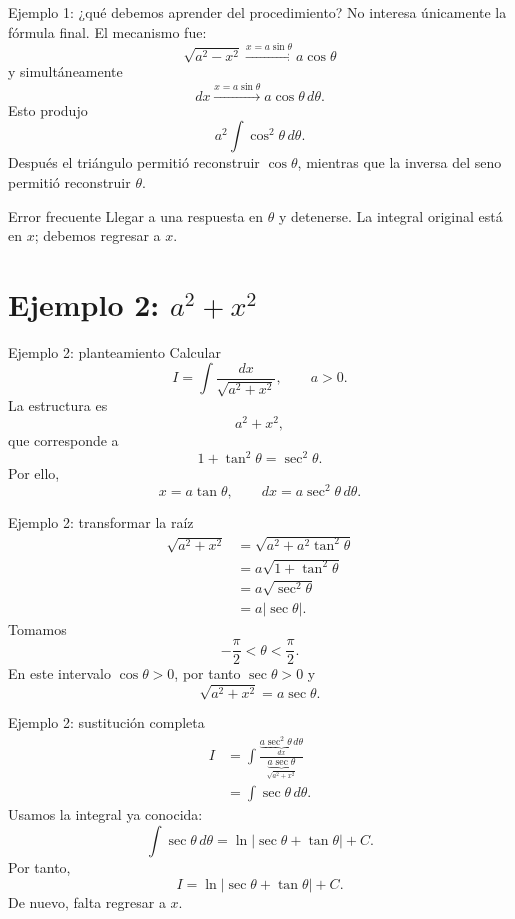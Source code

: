 \documentclass[10pt,aspectratio=169]{beamer}
\begin{document}
\begin{frame}{Ejemplo 1: ¿qué debemos aprender del procedimiento?}
No interesa únicamente la fórmula final. El mecanismo fue:
\[
\sqrt{a^2-x^2}
\xrightarrow{x=a\sin\theta}
a\cos\theta
\]
y simultáneamente
\[
dx\xrightarrow{x=a\sin\theta}a\cos\theta\,d\theta.
\]
Esto produjo
\[
a^2\int\cos^2\theta\,d\theta.
\]
Después el triángulo permitió reconstruir $\cos\theta$, mientras que la inversa del seno permitió reconstruir $\theta$.
\begin{alertblock}{Error frecuente}
Llegar a una respuesta en $\theta$ y detenerse. La integral original está en $x$; debemos regresar a $x$.
\end{alertblock}
\end{frame}

\section{Ejemplo 2: $a^2+x^2$}
\begin{frame}{Ejemplo 2: planteamiento}
Calcular
\[
\boxed{I=\int\frac{dx}{\sqrt{a^2+x^2}}},\qquad a>0.
\]
La estructura es
\[
a^2+x^2,
\]
que corresponde a
\[
1+\tan^2\theta=\sec^2\theta.
\]
Por ello,
\[
\boxed{x=a\tan\theta},\qquad
\boxed{dx=a\sec^2\theta\,d\theta}.
\]
\end{frame}

\begin{frame}{Ejemplo 2: transformar la raíz}
\begin{align*}
\sqrt{a^2+x^2}
&=\sqrt{a^2+a^2\tan^2\theta}\\
&=a\sqrt{1+\tan^2\theta}\\
&=a\sqrt{\sec^2\theta}\\
&=a|\sec\theta|.
\end{align*}
Tomamos
\[
-\frac{\pi}{2}<\theta<\frac{\pi}{2}.
\]
En este intervalo $\cos\theta>0$, por tanto $\sec\theta>0$ y
\[
\boxed{\sqrt{a^2+x^2}=a\sec\theta}.
\]
\end{frame}

\begin{frame}{Ejemplo 2: sustitución completa}
\begin{align*}
I
&=\int
\frac{\underbrace{a\sec^2\theta\,d\theta}_{dx}}
{\underbrace{a\sec\theta}_{\sqrt{a^2+x^2}}}\\
&=\int\sec\theta\,d\theta.
\end{align*}
Usamos la integral ya conocida:
\[
\int\sec\theta\,d\theta
=\ln|\sec\theta+\tan\theta|+C.
\]
Por tanto,
\[
\boxed{I=\ln|\sec\theta+\tan\theta|+C.}
\]
De nuevo, falta regresar a $x$.
\end{frame}
\end{document}
